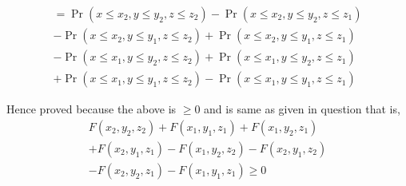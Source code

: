 \documentclass{beamer}
\providecommand{\pr}[1]{\ensuremath{\Pr\left(#1\right)}}
\begin{document}
          \begin{frame}
          \begin{align}
          =\pr{x\leq x_{2},y\leq y_{2},z\leq z_{2}}
        -\pr{x\leq x_{2},y\leq y_{2},z\leq z_{1}}\nonumber\\
        -\pr{x\leq x_{2},y\leq y_{1},z\leq z_{2}}
        +\pr{x\leq x_{2},y\leq y_{1},z\leq z_{1}}\nonumber\\
        -\pr{x\leq x_{1},y\leq y_{2},z\leq z_{2}}
        +\pr{x\leq x_{1},y\leq y_{2},z\leq z_{1}}\nonumber\\
        +\pr{x\leq x_{1},y\leq y_{1},z\leq z_{2}}
        -\pr{x\leq x_{1},y\leq y_{1},z\leq z_{1}}
        \end{align}
              \end{frame}
              \begin{frame}
              Hence proved because the above is $\geq0$ and is same as given in question that is,
         \begin{align}
         F(x_{2},y_{2},z_{2})+F(x_{1},y_{1},z_{1})+F(x_{1},y_{2},z_{1})\nonumber\\+F(x_{2},y_{1},z_{1})-F(x_{1},y_{2},z_{2})-F(x_{2},y_{1},z_{2})\nonumber\\-F(x_{2},y_{2},z_{1})-F(x_{1},y_{1},z_{1})\geq 0
         \end{align}
                  
              \end{frame}
              
     
 
\end{document}
